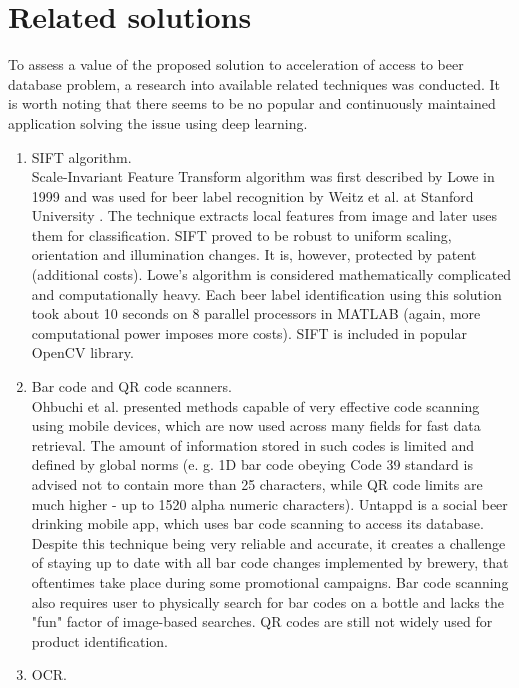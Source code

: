 \documentclass[11pt, a4paper]{article}
\begin{document}
\section{Related solutions} \label{related_solutions}
To assess a value of the proposed solution to acceleration of access to beer database problem, a research into available related techniques was conducted. It is worth noting that there seems to be no popular and continuously maintained application solving the issue using deep learning. 

\begin{enumerate}[1)]
\item SIFT algorithm.\\
Scale-Invariant Feature Transform algorithm was first described by Lowe in 1999 \cite{lowe_sift} and was used for beer label recognition by Weitz et al. at Stanford University \cite{beer_sift}. The technique extracts local features from image and later uses them for classification. SIFT proved to be robust to uniform scaling, orientation and illumination changes. It is, however, protected by patent (additional costs). Lowe's algorithm is considered mathematically complicated and computationally heavy. Each beer label identification using this solution took about 10 seconds on 8 parallel processors in MATLAB (again, more computational power imposes more costs). SIFT is included in popular OpenCV library.
\item Bar code and QR code scanners.\\
Ohbuchi et al. \cite{barcode_mobile} presented methods capable of very effective code scanning using mobile devices, which are now used across many fields for fast data retrieval. The amount of information stored in such codes is limited and defined by global norms (e. g. 1D bar code obeying Code 39 standard is advised not to contain more than 25 characters, while QR code limits are much higher - up to 1520 alpha numeric characters). Untappd is a social beer drinking mobile app, which uses bar code scanning to access its database. Despite this technique being very reliable and accurate, it creates a challenge of staying up to date with all bar code changes implemented by brewery, that oftentimes take place during some promotional campaigns. Bar code scanning also requires user to physically search for bar codes on a bottle and lacks the "fun" factor of image-based searches. QR codes are still not widely used for product identification.
\item OCR.\\

\end{enumerate}
\end{document}
